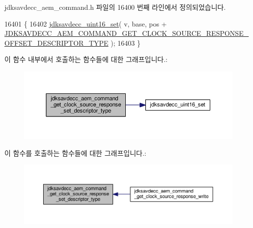 jdksavdecc\+\_\+aem\+\_\+command.\+h 파일의 16400 번째 라인에서 정의되었습니다.


\begin{DoxyCode}
16401 \{
16402     \hyperlink{group__endian_ga14b9eeadc05f94334096c127c955a60b}{jdksavdecc\_uint16\_set}( v, base, pos + 
      \hyperlink{group__command__get__clock__source__response_ga3ce197557899eb022e9bb35b3064a0f4}{JDKSAVDECC\_AEM\_COMMAND\_GET\_CLOCK\_SOURCE\_RESPONSE\_OFFSET\_DESCRIPTOR\_TYPE}
       );
16403 \}
\end{DoxyCode}


이 함수 내부에서 호출하는 함수들에 대한 그래프입니다.\+:
\nopagebreak
\begin{figure}[H]
\begin{center}
\leavevmode
\includegraphics[width=350pt]{group__command__get__clock__source__response_gafbcadf11126f91332045dabd1270b991_cgraph}
\end{center}
\end{figure}




이 함수를 호출하는 함수들에 대한 그래프입니다.\+:
\nopagebreak
\begin{figure}[H]
\begin{center}
\leavevmode
\includegraphics[width=350pt]{group__command__get__clock__source__response_gafbcadf11126f91332045dabd1270b991_icgraph}
\end{center}
\end{figure}


